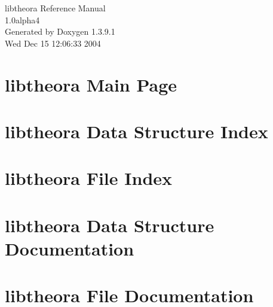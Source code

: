 \documentclass[a4paper]{book}
\begin{document}
\begin{titlepage}
\vspace*{7cm}
\begin{center}
{\Large libtheora Reference Manual\\[1ex]\large 1.0alpha4 }\\
\vspace*{1cm}
{\large Generated by Doxygen 1.3.9.1}\\
\vspace*{0.5cm}
{\small Wed Dec 15 12:06:33 2004}\\
\end{center}
\end{titlepage}
\clearemptydoublepage
{}
\tableofcontents
\clearemptydoublepage
{}
\chapter{libtheora Main Page}
\label{index}
\chapter{libtheora Data Structure Index}

\chapter{libtheora File Index}

\chapter{libtheora Data Structure Documentation}




\chapter{libtheora File Documentation}

\printindex
\end{document}
